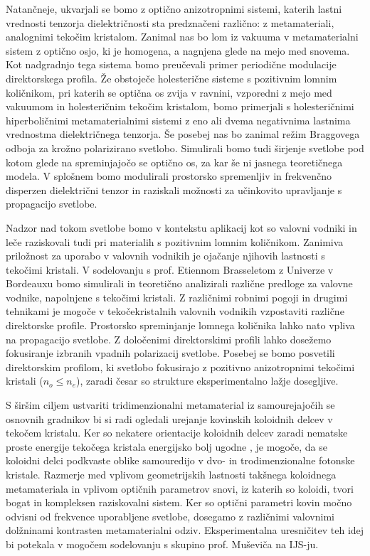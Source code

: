 \documentclass[a4paper,11pt]{article}
\begin{document}

Natančneje, ukvarjali se bomo z optično anizotropnimi sistemi, katerih lastni vrednosti tenzorja dielektričnosti sta predznačeni različno: z metamateriali, analognimi tekočim kristalom. 
Zanimal nas bo lom iz vakuuma v metamaterialni sistem z optično osjo, ki je homogena, a nagnjena glede na mejo med snovema. 
Kot nadgradnjo tega sistema bomo preučevali primer periodične modulacije direktorskega profila. 
Že obstoječe holesterične sisteme s pozitivnim lomnim količnikom, pri katerih se optična os zvija v ravnini, vzporedni z mejo med vakuumom in holesteričnim tekočim kristalom, bomo primerjali s holesteričnimi hiperboličnimi metamaterialnimi sistemi z eno ali dvema negativnima lastnima vrednostma dielektričnega tenzorja.
Še posebej nas bo zanimal režim Braggovega odboja za krožno polarizirano svetlobo. 
Simulirali bomo tudi širjenje svetlobe pod kotom glede na spreminjajočo se optično os, za kar še ni jasnega teoretičnega modela. 
V splošnem bomo modulirali prostorsko spremenljiv in frekvenčno disperzen dielektrični tenzor in raziskali možnosti za učinkovito upravljanje s propagacijo svetlobe. 



Nadzor nad tokom svetlobe bomo v kontekstu aplikacij kot so valovni vodniki in leče raziskovali tudi pri materialih s pozitivnim lomnim količnikom. 
Zanimiva priložnost za uporabo v valovnih vodnikih je ojačanje njihovih lastnosti s tekočimi kristali. 
V sodelovanju s prof. Etiennom Brasseletom z Univerze v Bordeauxu bomo simulirali in teoretično analizirali različne predloge za valovne vodnike, napolnjene s tekočimi kristali. 
Z različnimi robnimi pogoji in drugimi tehnikami je mogoče v tekočekristalnih valovnih vodnikih vzpostaviti različne direktorske profile. 
Prostorsko spreminjanje lomnega količnika lahko nato vpliva na propagacijo svetlobe. 
Z določenimi direktorskimi profili lahko dosežemo fokusiranje izbranih vpadnih polarizacij svetlobe. 
Posebej se bomo posvetili direktorskim profilom, ki svetlobo fokusirajo z pozitivno anizotropnimi tekočimi kristali ($n_o \leq n_e$), zaradi česar so strukture eksperimentalno lažje dosegljive. 



S širšim ciljem ustvariti tridimenzionalni metamaterial iz samourejajočih se osnovnih gradnikov bi si radi ogledali urejanje kovinskih koloidnih delcev v tekočem kristalu. 
Ker so nekatere orientacije koloidnih delcev zaradi nematske proste energije tekočega kristala energijsko bolj ugodne \cite{musevic-2013-assembly,smalyukh-2009-assembly}, je mogoče, da se koloidni delci podkvaste oblike samouredijo v dvo- in trodimenzionalne fotonske kristale. 
Razmerje med vplivom geometrijskih lastnosti takšnega koloidnega metamateriala in vplivom optičnih parametrov snovi, iz katerih so koloidi, tvori bogat in kompleksen raziskovalni sistem.
Ker so optični parametri kovin močno odvisni od frekvence uporabljene svetlobe, dosegamo z različnimi valovnimi dolžninami kontrasten metamaterialni odziv. 
Eksperimentalna uresničitev teh idej bi potekala v mogočem sodelovanju s skupino prof. Muševiča na IJS-ju. 
\end{document}
